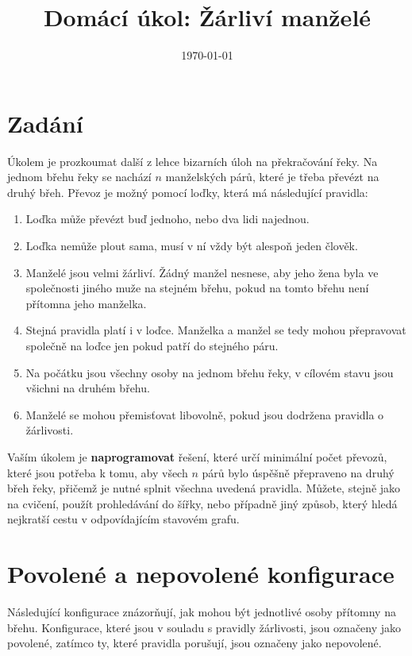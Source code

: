 \documentclass{article}
\title{Domácí úkol: Žárliví manželé}
\author{}
\date{\today}
\begin{document}
	
	\maketitle
	
	\section*{Zadání}
	Úkolem je prozkoumat další z lehce bizarních úloh na překračování řeky.
	Na jednom břehu řeky se nachází $n$ manželských párů, které je třeba převézt na druhý břeh. Převoz je možný pomocí loďky, která má následující pravidla:
	
	\begin{enumerate}
		\item Loďka může převézt buď jednoho, nebo dva lidi najednou.
		\item Loďka nemůže plout sama, musí v ní vždy být alespoň jeden člověk.
		\item Manželé jsou velmi žárliví. Žádný manžel nesnese, aby jeho žena byla ve společnosti jiného muže na stejném břehu, pokud na tomto břehu není přítomna jeho manželka.
		\item Stejná pravidla platí i v loďce. Manželka a manžel se tedy mohou přepravovat společně na loďce jen pokud patří do stejného páru.
		\item Na počátku jsou všechny osoby na jednom břehu řeky, v cílovém stavu jsou všichni na druhém břehu.
		\item Manželé se mohou přemisťovat libovolně, pokud jsou dodržena pravidla o žárlivosti.	
	\end{enumerate}
	
	Vaším úkolem je \textbf{naprogramovat} řešení, které určí minimální počet převozů, které jsou potřeba k tomu, aby všech $n$ párů bylo úspěšně přepraveno na druhý břeh řeky, přičemž je nutné splnit všechna uvedená pravidla.
	Můžete, stejně jako na cvičení, použít prohledávání do šířky, nebo případně jiný způsob, který hledá nejkratší cestu v odpovídajícím stavovém grafu.
	
	
	
	\section*{Povolené a nepovolené konfigurace}
	
	Následující konfigurace znázorňují, jak mohou být jednotlivé osoby přítomny na břehu. Konfigurace, které jsou v souladu s pravidly žárlivosti, jsou označeny jako povolené, zatímco ty, které pravidla porušují, jsou označeny jako nepovolené.
	
\end{document}
